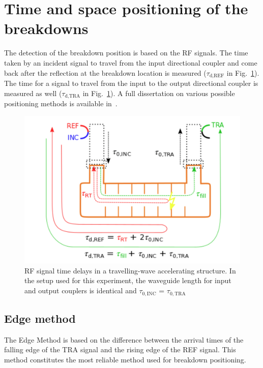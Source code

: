 \section[Time and space positioning of the breakdowns]{Time and space positioning of the breakdowns}

The detection of the breakdown position is based on the RF signals. The time taken by an incident signal to travel from the input directional coupler and come back after the reflection at the breakdown location is measured ($\tau_\text{d,REF}$  in Fig.~\ref{BD_scheme}). The time for a signal to travel from the input to the output directional coupler is measured as well ($\tau_\text{d,TRA}$ in Fig.~\ref{BD_scheme}).  A full dissertation on various possible positioning methods is available in~\cite{Rajamaki:2143815}.

\begin{figure}[h]
\centering 
\includegraphics[scale=0.29]{pictures/structure_scheme}
\caption{RF signal time delays in a travelling-wave accelerating structure. In the setup used for this experiment, the waveguide length for input and output couplers is identical and $\tau_{0,\text{INC}}$ = $\tau_{0,\text{TRA}}$}
\label{BD_scheme}
\end{figure}


\subsection[Edge method]{Edge method}

The Edge Method is based on the difference between the arrival times of the falling edge of the TRA signal and the rising edge of the REF signal. This method constitutes the most reliable method used for breakdown positioning. 

